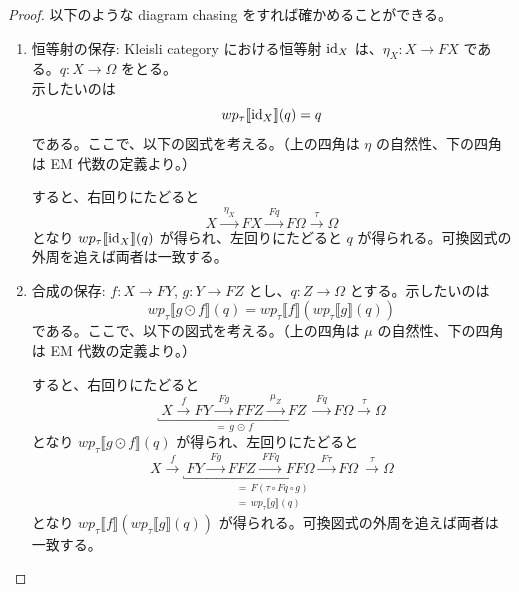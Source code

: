 \documentclass[
		head_space=20mm,
		foot_space=20mm,
		gutter=10mm,
		line_length=190mm
]{jlreq}
\begin{document}
\begin{proof}
	以下のような diagram chasing をすれば確かめることができる。
	\begin{enumerate}
		\item 恒等射の保存: Kleisli category における恒等射 $\mathrm{id}_X$ は、$\eta_X:X\to FX$ である。$q:X\to \Omega$ をとる。\\ 示したいのは \[wp_\tau\llbracket\mathrm{id}_X\rrbracket(q)=q\] である。ここで、以下の図式を考える。（上の四角は $\eta$ の自然性、下の四角は EM 代数の定義より。）
		\begin{center}
		\end{center}
		すると、右回りにたどると \[X\xrightarrow{\;\eta_X\;}FX\xrightarrow{\;Fq\;}F\Omega\xrightarrow{\;\tau\;}\Omega\] となり $wp_\tau\llbracket\mathrm{id}_X\rrbracket(q)$ が得られ、左回りにたどると $q$ が得られる。可換図式の外周を追えば両者は一致する。\vspace{8pt}
		\item 合成の保存: $f:X\to FY$, $g:Y\to FZ$ とし、$q:Z\to \Omega$ とする。示したいのは \[wp_\tau\llbracket g\odot f\rrbracket(q)=wp_\tau\llbracket f\rrbracket(wp_\tau\llbracket g\rrbracket(q))\] である。ここで、以下の図式を考える。（上の四角は $\mu$ の自然性、下の四角は EM 代数の定義より。）
		\begin{center}
		\end{center}
		すると、右回りにたどると
		\[\underbracket{~X\xrightarrow{\;f\;}FY\xrightarrow{\;Fg\;}FFZ\xrightarrow{\;\mu_Z\;}FZ~}_{=\,g\,\odot\,f}\xrightarrow{\;Fq\;}F\Omega\xrightarrow{\;\tau\;}\Omega\]
		となり $wp_\tau\llbracket g\odot f \rrbracket(q)$ が得られ、左回りにたどると
		\[X\xrightarrow{\;f\;} \underbracket{~FY\xrightarrow{\;Fg\;}FFZ\xrightarrow{\;FFq\;}FF\Omega\xrightarrow{\;F\tau\;}F\Omega~}_{\substack{=\,F(\tau\circ Fq\circ g)\\=\,wp_\tau\llbracket g\rrbracket(q)\;\,}}\xrightarrow{\tau}\Omega\] となり $wp_\tau\llbracket f\rrbracket(wp_\tau\llbracket g\rrbracket(q))$ が得られる。可換図式の外周を追えば両者は一致する。\vspace{-20pt}
	\end{enumerate}
\end{proof}
\end{document}
